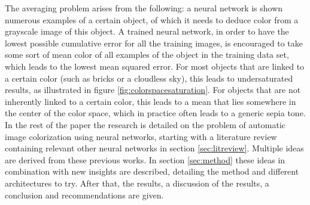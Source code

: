 The averaging problem arises from the following: a neural network is shown numerous examples of a certain object, of which it needs to deduce color from a grayscale image of this object. 
A trained neural network, in order to have the lowest possible cumulative error for all the training images, is encouraged to take some sort of mean color of all examples of the object in the training data set, which leads to the lowest mean squared error. For most objects that are linked to a certain color (such as bricks or a cloudless sky), this leads to undersaturated results, as illustrated in figure \ref{fig:colorspacesaturation}. 
For objects that are not inherently linked to a certain color, this leads to a mean that lies somewhere in the center of the color space, which in practice often leads to a generic sepia tone\cite{Dahl}.\\
	
In the rest of the paper the research is detailed on the problem of automatic image colorization using neural networks, starting with a literature review containing relevant other neural networks in section \ref{sec:litreview}. Multiple ideas are derived from these previous works. In section \ref{sec:method} these ideas in combination with new insights are described, detailing the method and different architectures to try. After that, the results, a discussion of the results, a conclusion and recommendations are given.





